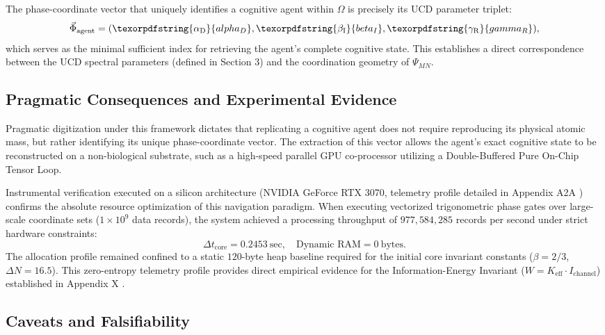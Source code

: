 \documentclass[12pt,a4paper]{article}
\DeclareRobustCommand{\alD}{\texorpdfstring{\ensuremath{\alpha_{\mathrm{D}}}}{alpha_D}}
\DeclareRobustCommand{\beI}{\texorpdfstring{\ensuremath{\beta_{\mathrm{I}}}}{beta_I}}
\DeclareRobustCommand{\gaR}{\texorpdfstring{\ensuremath{\gamma_{\mathrm{R}}}}{gamma_R}}
\begin{document}
	The phase-coordinate vector that uniquely identifies a cognitive agent within \(\Omega\) is precisely its UCD parameter triplet:
	\[
	\vec{\Phi}_{\mathrm{agent}} = (\alD, \beI, \gaR),
	\]
	which serves as the minimal sufficient index for retrieving the agent's complete cognitive state. This establishes a direct correspondence between the UCD spectral parameters (defined in Section 3) and the coordination geometry of \(\Psi_{MN}\).
	
	\subsection{Pragmatic Consequences and Experimental Evidence}
	
	Pragmatic digitization under this framework dictates that replicating a cognitive agent does not require reproducing its physical atomic mass, but rather identifying its unique phase-coordinate vector. The extraction of this vector allows the agent's exact cognitive state to be reconstructed on a non-biological substrate, such as a high-speed parallel GPU co-processor utilizing a Double-Buffered Pure On-Chip Tensor Loop.
	
	Instrumental verification executed on a silicon architecture (NVIDIA GeForce RTX 3070, telemetry profile detailed in Appendix A2A \cite{yuct_a2a}) confirms the absolute resource optimization of this navigation paradigm. When executing vectorized trigonometric phase gates over large-scale coordinate sets (\(1\times10^9\) data records), the system achieved a processing throughput of \(977,584,285\) records per second under strict hardware constraints:
	\begin{equation}
		\Delta t_{\mathrm{core}} = 0.2453\ \text{sec}, \quad \text{Dynamic RAM} = 0\ \text{bytes}.
	\end{equation}
	The allocation profile remained confined to a static \(120\)-byte heap baseline required for the initial core invariant constants (\(\beta = 2/3\), \(\Delta N = 16.5\)). This zero-entropy telemetry profile provides direct empirical evidence for the Information-Energy Invariant (\(W = K_{\mathrm{eff}} \cdot I_{\mathrm{channel}}\)) established in Appendix X \cite{yuct_appX}.
	
	\subsection{Caveats and Falsifiability}
	
\end{document}
